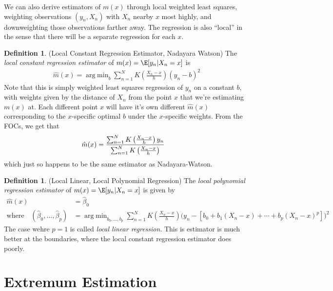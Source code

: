 \documentclass[12pt]{article}
\theoremstyle{plain}
\theoremstyle{definition}
\newtheorem{defn}[thm]{Definition}
\theoremstyle{remark}
\DeclareMathOperator*{\argmin}{arg\;min}
\newcommand{\sumnN}{\sum^N_{n=1}}
\begin{document}
\clearpage

We can also derive estimators of $m(x)$ through local weighted least
squares, weighting observations $(y_n,X_n)$ with $X_n$ nearby $x$ most
highly, and downweighting those observations farther away.
The regression is also ``local'' in the sense that there will be a
separate regression for each $x$.

\begin{defn}(Local Constant Regression Estimator, Nadayara Watson)
The \emph{local constant regression estimator} of $m(x)=\E[y_n|X_n=x]$
is
\begin{align*}
  \hat{m}(x)
  =
  \argmin_{b}
  \sumnN
  K\left(
  \frac{X_n-x}{h}
  \right)
  (y_n-b)^2
\end{align*}
Note that this is simply weighted least squares regression of $y_n$ on a
constant $b$, with weights given by the distance of $X_n$ from the point
$x$ that we're estimating $m(x)$ at.
Each different point $x$ will have it's own different $\hat{m}(x)$
corresponding to the $x$-specific optimal $b$ under the $x$-specific
weights.
From the FOCs, we get that
\begin{align*}
  \hat{m}(x)
  &=
  \frac{%
    \sumnN
    K\left(
    \frac{X_n-x}{h}
    \right)
    y_n
  }{%
    \sumnN
    K\left( \frac{X_n-x}{h}
    \right)
  }
\end{align*}
which just so happens to be the same estimator as Nadayara-Watson.
\end{defn}

\begin{defn}(Local Linear, Local Polynomial Regression)
The \emph{local polynomial regression estimator} of $m(x)=\E[y_n|X_n=x]$
is given by \begin{align*}
  \hat{m}(x)
  &=
  \hat{\beta}_0
  \\
  \text{where}\quad
  (\hat{\beta}_0,\ldots,\hat{\beta}_p)
  &=
  \argmin_{b_0,\ldots,b_p}
  \sumnN
  K\left(
  \frac{X_n-x}{h}
  \right)
  \big(y_n-[b_0+b_1(X_n-x)+\cdots +b_p(X_n-x)^p]\big)^2
\end{align*}
The case wehre $p=1$ is called \emph{local linear regression}.
This is estimator is much better at the boundaries, where the local
constant regression estimator does poorly.
\end{defn}



\clearpage
\section{Extremum Estimation}
\end{document}

